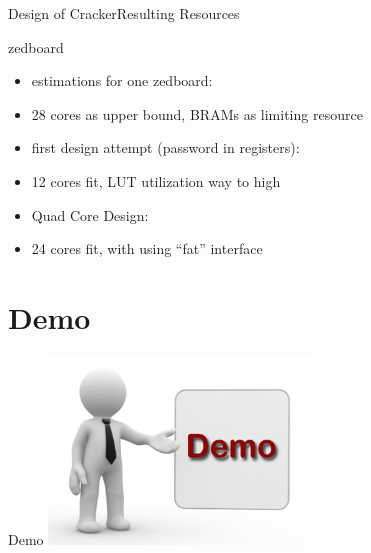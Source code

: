 \begin{frame}{Design of Cracker}{Resulting Resources}
    \begin{block}{zedboard}
      \begin{itemize}
          \item estimations for one zedboard:
          \item[] 28 cores as upper bound, BRAMs as limiting resource
          \item first design attempt (password in registers):
          \item[] 12 cores fit, LUT utilization way to high
          \item Quad Core Design:
          \item[] 24 cores fit, with using \enquote{fat} interface
      \end{itemize}
    \end{block}
\end{frame}

\section{Demo}
\begin{frame}{Demo}
    \center \includegraphics[height=50mm]{data/demo.png}
\end{frame}

